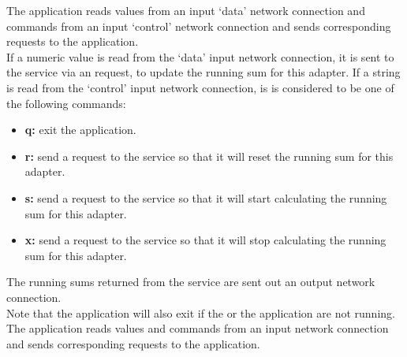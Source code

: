 The  application reads  values from an input
`data' \yarp{} network connection and commands from an input `control' \yarp{} network
connection and sends corresponding requests to the
 application.\\

If a numeric value is read from the `data' input \yarp{} network connection, it is sent to
the service via an  request, to update the
running sum for this adapter.
If a string is read from the `control' input \yarp{} network connection, is is considered
to be one of the following commands:
\begin{itemize}
\item \textbf{q:} exit the application.
\item \textbf{r:} send a  request to the
service so that it will reset the running sum for this adapter.
\item \textbf{s:} send a  request to the
service so that it will start calculating the running sum for this adapter.
\item \textbf{x:} send a  request to the
service so that it will stop calculating the running sum for this adapter.
\end{itemize}
The running sums returned from the service are sent out an output \yarp{} network
connection.\\

Note that the application will also exit if the
 or the
 application are not running.
The  application reads  values and
commands from an input \yarp{} network connection and sends corresponding requests to the
 application.\\

